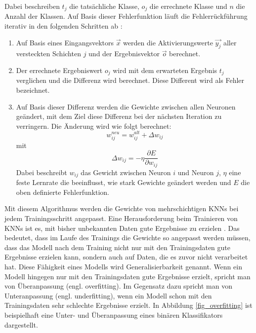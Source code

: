 Dabei beschreiben $t_j$ die tatsächliche Klasse, $o_j$ die errechnete Klasse und $n$ die Anzahl der Klassen. Auf Basis dieser Fehlerfunktion läuft die Fehlerrückführung iterativ in den folgenden Schritten ab \cite{bishop2006pattern}:

\begin{enumerate}
\item Auf Basis eines Eingangsvektors $\vec{x}$ werden die Aktivierungswerte $\vec{y_j}$ aller versteckten Schichten $j$ und der Ergebnisvektor $\vec{o}$ berechnet.
\item Der errechnete Ergebniswert $o_j$ wird mit dem erwarteten Ergebnis $t_j$ verglichen und die Differenz wird berechnet. Diese Different wird als Fehler bezeichnet.
\item Auf Basis dieser Differenz werden die Gewichte zwischen allen Neuronen geändert, mit dem Ziel diese Differenz bei der nächsten Iteration zu verringern. Die Änderung wird wie folgt berechnet:
\begin{equation}
w^{neu}_{ij} = w^{alt}_{ij} + \Delta w_{ij}
\end{equation}
mit
\begin{equation}
\Delta w_{ij} = -\eta \frac{\partial E}{\partial w_{ij}}
\end{equation}
Dabei beschreibt $w_{ij}$ das Gewicht zwischen Neuron $i$ und Neuron $j$, $\eta$ eine feste Lernrate die beeinflusst, wie stark Gewichte geändert werden und $E$ die oben definierte Fehlerfunktion.
\end{enumerate}

Mit diesem Algorithmus werden die Gewichte von mehrschichtigen \acp{KNN} bei jedem Trainingsschritt angepasst. Eine Herausforderung beim Trainieren von \acp{KNN} ist es, mit bisher unbekannten Daten gute Ergebnisse zu erzielen \cite{srivastava2014dropout}. Das bedeutet, dass im Laufe des Trainings die Gewichte so angepasst werden müssen, dass das Modell nach dem Training nicht nur mit den Trainingsdaten gute Ergebnisse erzielen kann, sondern auch auf Daten, die es zuvor nicht verarbeitet hat. Diese Fähigkeit eines Modells wird Generalisierbarkeit genannt. Wenn ein Modell hingegen nur mit den Trainingsdaten gute Ergebnisse erzielt, spricht man von Überanpassung (engl. overfitting). Im Gegensatz dazu spricht man von Unteranpassung (engl. underfitting), wenn ein Modell schon mit den Trainingsdaten sehr schlechte Ergebnisse erzielt. In Abbildung \ref{fig_overfitting} ist beispielhaft eine Unter- und Überanpassung eines binären Klassifikators dargestellt.

